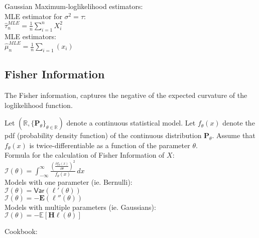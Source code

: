 Gaussian Maximum-loglikelihood estimators:\\

 MLE estimator for $\sigma^2 = \tau$:\\  
$\hat{\tau }_ n^{MLE} = \frac{1}{n} \sum _{i = 1}^ n X_ i^2$\\

MLE estimators:\\

$\hat{\mu}_ n^{MLE}=\frac{1}{n}\sum_{i=1}(x_i)$


\subsection{Fisher Information}

The Fisher information, captures the negative of the expected curvature of the loglikelihood function.

Let $(\mathbb {R}, \{ \mathbf{P}_\theta \} _{\theta \in \mathbb {R}})$ denote a continuous statistical model. Let $f_\theta (x)$ denote the pdf (probability density function) of the continuous distribution $\mathbf{P}_\theta$. Assume that $f_\theta (x)$ is twice-differentiable as a function of the parameter $\theta$.\\

Formula for the calculation of Fisher Information of $X$:\\

$\displaystyle  \mathcal{I}(\theta )= \int _{-\infty }^\infty \frac{\left(\frac{\partial f_\theta (x)}{\partial \theta }\right)^2}{f_\theta (x)} \,  dx$ \\

Models with one parameter (ie. Bernulli):\\

$\mathcal{I}(\theta ) = \textsf{Var}(\ell '(\theta ))$\\

$\mathcal{I}(\theta ) = - \mathbf{E}(\ell ''(\theta ))$\\

Models with multiple parameters (ie. Gaussians):\\

$\mathcal{I}(\theta ) = -\mathbb E\left[\mathbf{H}\ell (\theta )\right]$

Cookbook:\\

